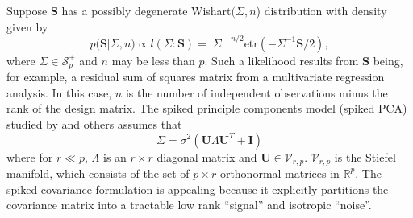 \documentclass[12pt]{article}
\newcommand{\bl}[1]{{\mathbf #1}}
\newcommand{\etr}{\text{etr}}
\begin{document}
Suppose $\bl S$ has a possibly degenerate Wishart$(\Sigma,n$)
distribution with density given by
\begin{equation} 
p(\bl S | \Sigma, n) \propto l(\Sigma:\bl S) =  |\Sigma|^{-n/2} \text{etr}( - \Sigma^{-1} \bl S/2 ) ,  
\label{eqn:lik}
\end{equation}
%
\noindent where $\Sigma \in \mathcal S_p^+$ and $n$ may be less than $p$.  Such
a likelihood results from $\bl S$ being, for example, a residual sum
of squares matrix from a multivariate regression analysis. In this
case, $n$ is the number of independent observations minus the rank of
the design matrix.  The spiked principle components model (spiked PCA)
studied by \citet{Johnstone2001} and others assumes that
\begin{equation} 
\Sigma = \sigma^2 (  \bl U  \Lambda  \bl U^T  + \bl I )
\label{eqn:spiked}
\end{equation}
%
\noindent where for $r \ll p$, $\Lambda$ is an $r\times r$ diagonal
matrix and $\bl U \in \mathcal V_{r,p}$.  $\mathcal V_{r,p}$ is the
Stiefel manifold, which consists of the set of $p \times r$
orthonormal matrices in $\mathbb{R}^p$.  %
The spiked covariance formulation is appealing because it explicitly
partitions the covariance matrix into a tractable low rank ``signal''
and isotropic ``noise''.

\end{document}
